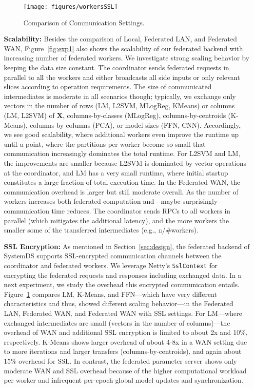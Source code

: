 \documentclass[sigconf,screen]{acmart}
\newcommand{\mat}[1]{\ensuremath{\mathbf{#1}}}
\begin{document}
\begin{figure}[!t]
	\centering
	\texttt{[image: figures/workersSSL]}
	\vspace{-0.25cm}
	\caption{\label{fig:exp2}Comparison of Communication Settings.}
	\vspace{-0.1cm}
\end{figure}

\textbf{Scalability:} Besides the comparison of Local, Federated LAN, and Federated WAN, Figure~\ref{fig:exp1} also shows the scalability of our federated backend with increasing number of federated workers. We investigate strong scaling behavior by keeping the data size constant. The coordinator sends federated requests in parallel to all the workers and either broadcasts all side inputs or only relevant slices according to operation requirements. The size of communicated intermediates is moderate in all scenarios though; typically, we exchange only vectors in the number of rows (LM, L2SVM, MLogReg, KMeans) or columns (LM, L2SVM) of $\mat{X}$, columns-by-classes (MLogReg), columns-by-centroids (K-Means), columns-by-columns (PCA), or model sizes (FFN, CNN). Accordingly, we see good scalability, where additional workers even improve the runtime up until a point, where the partitions per worker become so small that communication increasingly dominates the total runtime. For L2SVM and LM, the improvements are smaller because L2SVM is dominated by vector operations at the coordinator, and LM has a very small runtime, where initial startup constitutes a large fraction of total execution time. 
In the Federated WAN, the communication overhead is larger but still moderate overall. As the number of workers increases both federated computation and---maybe surprisingly---communication time reduces. The coordinator sends RPCs to all workers in parallel (which mitigates the additional latency), and the more workers the smaller some of the transferred intermediates (e.g., n/\#workers).

\textbf{SSL Encryption:} As mentioned in Section~\ref{sec:design}, the federated backend of SystemDS supports SSL-encrypted communication channels between the coordinator and federated workers. We leverage Netty's \texttt{SslContext} for encrypting the federated requests and responses including exchanged data. In a next experiment, we study the overhead this encrypted communication entails. Figure~\ref{fig:exp2} compares LM, K-Means, and FFN---which have very different characteristics and thus, showed different scaling behavior---in the Federated LAN, Federated WAN, and Federated WAN with SSL settings. For LM---where exchanged intermediates are small (vectors in the number of columns)---the overhead of WAN and additional SSL encryption is limited to about 2x and 10\%, respectively. K-Means shows larger overhead of about 4-8x in a WAN setting due to more iterations and larger transfers (columns-by-centroids), and again about 15\% overhead for SSL. In contrast, the federated parameter server shows only moderate WAN and SSL overhead because of the higher computational workload per worker and infrequent per-epoch global model updates and synchronization.
\end{document}
